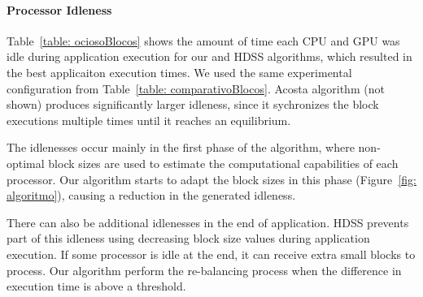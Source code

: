 \documentclass[journal]{IEEEtran}
\begin{document}
\paragraph{Processor Idleness} Table~\ref{table: ociosoBlocos} shows the amount of time each CPU and GPU was
idle during application execution for our and HDSS algorithms, which resulted in
the best applicaiton execution times. We used the same experimental
configuration from Table~\ref{table: comparativoBlocos}. Acosta algorithm (not
shown) produces significantly larger idleness, since it sychronizes the block
executions multiple times until it reaches an equilibrium.

The idlenesses occur mainly in the first phase of the algorithm, where
non-optimal block sizes are used to estimate the computational capabilities of
each processor. Our algorithm starts to adapt the block sizes in this phase
(Figure~\ref{fig: algoritmo}), causing a reduction in the generated idleness.

There can also be additional idlenesses in the end of application. HDSS prevents
part of this idleness using decreasing block size values during application
execution. If some processor is idle at the end, it can receive extra small
blocks to process. Our algorithm perform the re-balancing process when the
difference in execution time is above a threshold.




%	
\end{document}
